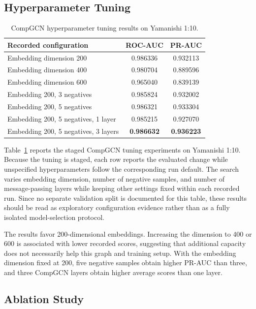 \subsection{Hyperparameter Tuning}
\label{sec:hyperparameter_tuning}

\begin{table}[!htbp]
\centering
\caption{CompGCN hyperparameter tuning results on Yamanishi 1:10.}
\label{tab:compgcn_tuning}
\small
\begin{tabularx}{\columnwidth}{Xcc}
\toprule
\textbf{Recorded configuration} & \textbf{ROC-AUC} & \textbf{PR-AUC} \\
\midrule
Embedding dimension 200 & 0.986336 & 0.932113 \\
Embedding dimension 400 & 0.980704 & 0.889596 \\
Embedding dimension 600 & 0.965040 & 0.839139 \\
Embedding 200, 3 negatives & 0.985824 & 0.932002 \\
Embedding 200, 5 negatives & 0.986321 & 0.933304 \\
Embedding 200, 5 negatives, 1 layer & 0.985215 & 0.927070 \\
Embedding 200, 5 negatives, 3 layers & \textbf{0.986632} & \textbf{0.936223} \\
\bottomrule
\end{tabularx}
\end{table}

Table~\ref{tab:compgcn_tuning} reports the staged CompGCN tuning experiments on Yamanishi 1:10. Because the tuning is staged, each row reports the evaluated change while unspecified hyperparameters follow the corresponding run default. The search varies embedding dimension, number of negative samples, and number of message-passing layers while keeping other settings fixed within each recorded run. Since no separate validation split is documented for this table, these results should be read as exploratory configuration evidence rather than as a fully isolated model-selection protocol.

The results favor 200-dimensional embeddings. Increasing the dimension to 400 or 600 is associated with lower recorded scores, suggesting that additional capacity does not necessarily help this graph and training setup. With the embedding dimension fixed at 200, five negative samples obtain higher PR-AUC than three, and three CompGCN layers obtain higher average scores than one layer.

\subsection{Ablation Study}
\label{sec:ablation_study}

